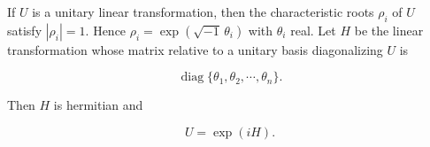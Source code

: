 If $U$ is a unitary linear transformation, then the characteristic roots $\rho_i$ of $U$ satisfy $|\rho_i| = 1$. Hence $\rho_i = \exp(\sqrt{-1}\,\theta_i)$ with $\theta_i$ real. Let $H$ be the linear transformation whose matrix relative to a unitary basis diagonalizing $U$ is

$$\operatorname{diag}\{\theta_1, \theta_2, \cdots, \theta_n\}.$$

Then $H$ is hermitian and

$$U = \exp(iH).$$
